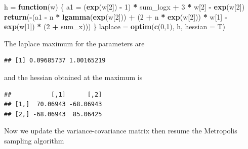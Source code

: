 \documentclass[]{article}
\newenvironment{Shaded}{\begin{snugshade}}{\end{snugshade}}
\newcommand{\KeywordTok}[1]{\textcolor[rgb]{0.13,0.29,0.53}{\textbf{#1}}}
\newcommand{\DataTypeTok}[1]{\textcolor[rgb]{0.13,0.29,0.53}{#1}}
\newcommand{\DecValTok}[1]{\textcolor[rgb]{0.00,0.00,0.81}{#1}}
\newcommand{\StringTok}[1]{\textcolor[rgb]{0.31,0.60,0.02}{#1}}
\newcommand{\ControlFlowTok}[1]{\textcolor[rgb]{0.13,0.29,0.53}{\textbf{#1}}}
\newcommand{\OperatorTok}[1]{\textcolor[rgb]{0.81,0.36,0.00}{\textbf{#1}}}
\newcommand{\NormalTok}[1]{#1}
\begin{document}
\begin{Shaded}
\begin{Highlighting}[]
\NormalTok{h =}\StringTok{ }\ControlFlowTok{function}\NormalTok{(w) \{}
\NormalTok{  a1 =}\StringTok{ }\NormalTok{(}\KeywordTok{exp}\NormalTok{(w[}\DecValTok{2}\NormalTok{]) }\OperatorTok{-}\StringTok{ }\DecValTok{1}\NormalTok{) }\OperatorTok{*}\StringTok{ }\NormalTok{sum_logx }\OperatorTok{+}\StringTok{ }\DecValTok{3} \OperatorTok{*}\StringTok{ }\NormalTok{w[}\DecValTok{2}\NormalTok{] }\OperatorTok{-}\StringTok{ }\KeywordTok{exp}\NormalTok{(w[}\DecValTok{2}\NormalTok{])}
  \KeywordTok{return}\NormalTok{(}\OperatorTok{-}\NormalTok{(a1 }\OperatorTok{-}\StringTok{ }\NormalTok{n }\OperatorTok{*}\StringTok{ }\KeywordTok{lgamma}\NormalTok{(}\KeywordTok{exp}\NormalTok{(w[}\DecValTok{2}\NormalTok{])) }\OperatorTok{+}\StringTok{ }
\StringTok{             }\NormalTok{(}\DecValTok{2} \OperatorTok{+}\StringTok{ }\NormalTok{n }\OperatorTok{*}\StringTok{ }\KeywordTok{exp}\NormalTok{(w[}\DecValTok{2}\NormalTok{])) }\OperatorTok{*}\StringTok{ }\NormalTok{w[}\DecValTok{1}\NormalTok{] }\OperatorTok{-}\StringTok{ }\KeywordTok{exp}\NormalTok{(w[}\DecValTok{1}\NormalTok{]) }\OperatorTok{*}\StringTok{ }\NormalTok{(}\DecValTok{2} \OperatorTok{+}\StringTok{ }\NormalTok{sum_x)))}
\NormalTok{\}}
\NormalTok{laplace =}\StringTok{ }\KeywordTok{optim}\NormalTok{(}\KeywordTok{c}\NormalTok{(}\DecValTok{0}\NormalTok{,}\DecValTok{1}\NormalTok{), h, }\DataTypeTok{hessian =}\NormalTok{ T)}
\end{Highlighting}
\end{Shaded}

The laplace maximum for the parameters are

\begin{verbatim}
## [1] 0.09685737 1.00165219
\end{verbatim}

and the hessian obtained at the maximum is

\begin{verbatim}
##           [,1]      [,2]
## [1,]  70.06943 -68.06943
## [2,] -68.06943  85.06425
\end{verbatim}

Now we update the variance-covariance matrix then resume the Metropolis
sampling algorithm
\end{document}
